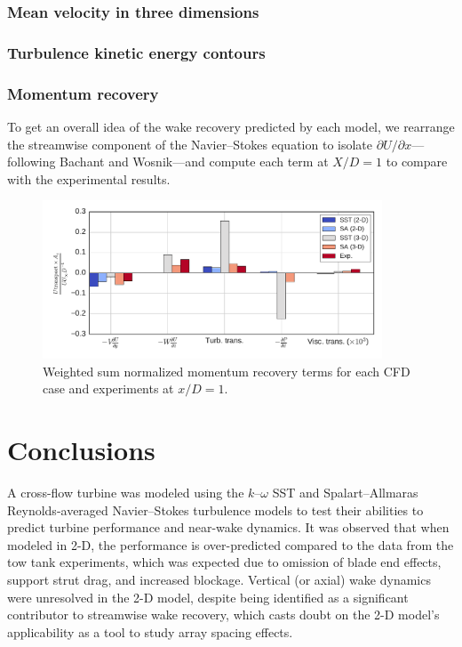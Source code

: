 \documentclass[aip,graphicx]{revtex4-1}
\begin{document}
\subsubsection{Mean velocity in three dimensions}



\subsubsection{Turbulence kinetic energy contours}



\subsubsection{Momentum recovery}

To get an overall idea of the wake recovery predicted by each model, we
rearrange the streamwise component of the Navier--Stokes equation to isolate
$\partial U / \partial x$---following Bachant and
Wosnik\cite{Bachant2015-JoT}---and compute each term at $X/D = 1$ to compare
with the experimental results.

\begin{figure}[ht]
    \centering

    \includegraphics[width=0.9\textwidth]{figures/mom_bar_graph}

    \caption{Weighted sum normalized momentum recovery terms for each CFD case
        and experiments\cite{Bachant2015-JoT} at $x/D=1$.}

    \label{fig:recovery}
\end{figure}


\section{Conclusions}

A cross-flow turbine was modeled using the $k$--$\omega$ SST and
Spalart--Allmaras Reynolds-averaged Navier--Stokes turbulence models to test
their abilities to predict turbine performance and near-wake dynamics. It was
observed that when modeled in 2-D, the performance is over-predicted compared to
the data from the tow tank experiments, which was expected due to omission of
blade end effects, support strut drag, and increased blockage. Vertical (or
axial) wake dynamics were unresolved in the 2-D model, despite being identified
as a significant contributor to streamwise wake recovery, which casts doubt on
the 2-D model's applicability as a tool to study array spacing effects.
\end{document}
